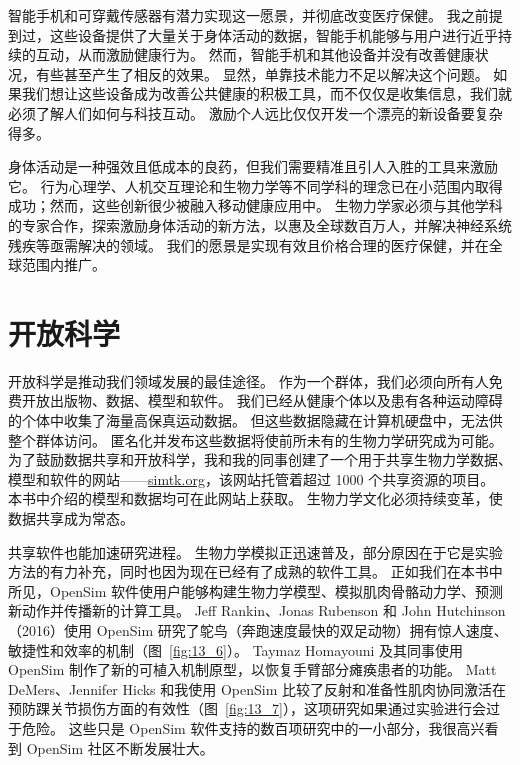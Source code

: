 智能手机和可穿戴传感器有潜力实现这一愿景，并彻底改变医疗保健。
我之前提到过，这些设备提供了大量关于身体活动的数据，智能手机能够与用户进行近乎持续的互动，从而激励健康行为。
然而，智能手机和其他设备并没有改善健康状况，有些甚至产生了相反的效果\cite{jakicic2016effect}。
显然，单靠技术能力不足以解决这个问题。
如果我们想让这些设备成为改善公共健康的积极工具，而不仅仅是收集信息，我们就必须了解人们如何与科技互动。
激励个人远比仅仅开发一个漂亮的新设备要复杂得多。


身体活动是一种强效且低成本的良药，但我们需要精准且引人入胜的工具来激励它。
行为心理学、人机交互理论和生物力学等不同学科的理念已在小范围内取得成功；然而，这些创新很少被融入移动健康应用中。
生物力学家必须与其他学科的专家合作，探索激励身体活动的新方法，以惠及全球数百万人，并解决神经系统残疾等亟需解决的领域。
我们的愿景是实现有效且价格合理的医疗保健，并在全球范围内推广。

\section{开放科学}

开放科学是推动我们领域发展的最佳途径。
作为一个群体，我们必须向所有人免费开放出版物、数据、模型和软件。
我们已经从健康个体以及患有各种运动障碍的个体中收集了海量高保真运动数据。
但这些数据隐藏在计算机硬盘中，无法供整个群体访问。
匿名化并发布这些数据将使前所未有的生物力学研究成为可能。
为了鼓励数据共享和开放科学，我和我的同事创建了一个用于共享生物力学数据、模型和软件的网站——\href{simtk.org}{simtk.org}，该网站托管着超过 1000 个共享资源的项目。
本书中介绍的模型和数据均可在此网站上获取。
生物力学文化必须持续变革，使数据共享成为常态。


共享软件也能加速研究进程。
生物力学模拟正迅速普及，部分原因在于它是实验方法的有力补充，同时也因为现在已经有了成熟的软件工具。
正如我们在本书中所见，OpenSim 软件使用户能够构建生物力学模型、模拟肌肉骨骼动力学、预测新动作并传播新的计算工具。
Jeff Rankin、Jonas Rubenson 和 John Hutchinson（2016）使用 OpenSim 研究了鸵鸟（奔跑速度最快的双足动物）拥有惊人速度、敏捷性和效率的机制（图~\ref{fig:13_6}）。
Taymaz Homayouni 及其同事\cite{homayouni2015modeling}使用 OpenSim 制作了新的可植入机制原型，以恢复手臂部分瘫痪患者的功能。
Matt DeMers、Jennifer Hicks 和我使用 OpenSim 比较了反射和准备性肌肉协同激活在预防踝关节损伤方面的有效性（图~\ref{fig:13_7}），这项研究如果通过实验进行会过于危险。
这些只是 OpenSim 软件支持的数百项研究中的一小部分，我很高兴看到 OpenSim 社区不断发展壮大。


